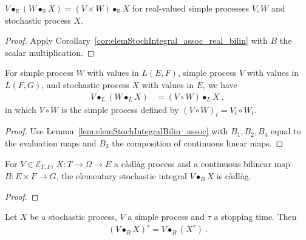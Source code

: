 \begin{lemma}\label{lem:elemStochIntegral_assoc}
$V \bullet_{\mathbb{R}} (W \bullet_{\mathbb{R}} X) = (V \times W) \bullet_{\mathbb{R}} X$ for real-valued simple processes $V, W$ and stochastic process $X$.
\end{lemma}

\begin{proof}
Apply Corollary~\ref{cor:elemStochIntegral_assoc_real_bilin} with $B$ the scalar multiplication.
\end{proof}


\begin{lemma}\label{lem:elemStochIntegralLinear_assoc}
  \leanok
For simple process $W$ with values in $L(E, F)$, simple process $V$ with values in $L(F, G)$, and stochastic process $X$ with values in $E$, we have
\begin{align*}
  V \bullet_L (W \bullet_L X)
  &= (V \circ W) \bullet_L X
  \: ,
\end{align*}
in which $V \circ W$ is the simple process defined by $(V \circ W)_t = V_t \circ W_t$.
\end{lemma}

\begin{proof}
  \leanok
Use Lemma~\ref{lem:elemStochIntegralBilin_assoc} with $B_1, B_2, B_4$ equal to the evaluation maps and $B_3$ the composition of continuous linear maps.
\end{proof}


\begin{lemma}\label{lem:cadlag_elemStochIntegralBilin}
For $V \in \mathcal{E}_{T, F}$, $X : T \to \Omega \to E$ a càdlàg process and a continuous bilinear map $B: E \times F \to G$, the elementary stochastic integral $V \bullet_B X$ is càdlàg.
\end{lemma}

\begin{proof}

\end{proof}


\begin{lemma}\label{lem:elemStochIntegral_stoppedProcess}
  \leanok
Let $X$ be a stochastic process, $V$ a simple process and $τ$ a stopping time.
Then
\begin{align*}
  (V \bullet_B X)^τ = V \bullet_B (X^τ)
  \: .
\end{align*}
\end{lemma}

